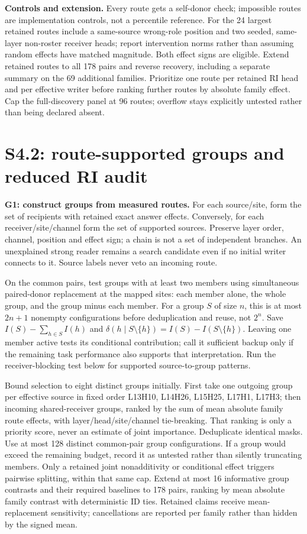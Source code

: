 \documentclass[11pt,a4paper]{article}
\begin{document}
\textbf{Controls and extension.} Every route gets a self-donor check; impossible
routes are implementation controls, not a percentile reference. For the 24 largest
retained routes include a same-source wrong-role position and two seeded,
same-layer non-roster receiver heads; report intervention norms rather than assuming
random effects have matched magnitude. Both effect signs are eligible. Extend
retained routes to all 178 pairs and reverse recovery, including a separate summary
on the 69 additional families. Prioritize one route per retained RI head and per
effective writer before ranking further routes by absolute family effect. Cap the
full-discovery panel at 96 routes; overflow stays explicitly untested rather than
being declared absent.

\section{S4.2: route-supported groups and reduced RI audit}
\label{sec:groups}
\textbf{G1: construct groups from measured routes.} For each source/site, form the
set of recipients with retained exact answer effects. Conversely, for each
receiver/site/channel form the set of supported sources. Preserve layer order,
channel, position and effect sign; a chain is not a set of independent branches.
An unexplained strong reader remains a search candidate even if no initial writer
connects to it. Source labels never veto an incoming route.

On the common pairs, test groups with at least two members using simultaneous
paired-donor replacement at the mapped sites: each member alone, the whole group,
and the group minus each member. For a group $S$ of size $n$, this is at most
$2n+1$ nonempty configurations before deduplication and reuse, not $2^n$.
Save $I(S)-\sum_{h\in S}I(h)$ and
$\delta(h\mid S\setminus\{h\})=I(S)-I(S\setminus\{h\})$.
Leaving one member active tests its conditional contribution; call it sufficient
backup only if the remaining task performance also supports that interpretation.
Run the receiver-blocking test below for supported source-to-group patterns.

Bound selection to eight distinct groups initially. First take one outgoing group
per effective source in fixed order L13H10, L14H26, L15H25, L17H1, L17H3; then
incoming shared-receiver groups, ranked by the sum of mean absolute family route
effects, with layer/head/site/channel tie-breaking. That ranking is only a priority
score, never an estimate of joint importance. Deduplicate identical masks.
Use at most 128 distinct common-pair group configurations. If a group would exceed
the remaining budget, record it as untested rather than silently truncating members.
Only a retained joint nonadditivity or conditional effect triggers pairwise splitting,
within that same cap. Extend at most 16 informative group contrasts and their required
baselines to 178 pairs, ranking by mean absolute family contrast with deterministic
ID ties. Retained claims receive mean-replacement sensitivity; cancellations are
reported per family rather than hidden by the signed mean.
\end{document}
